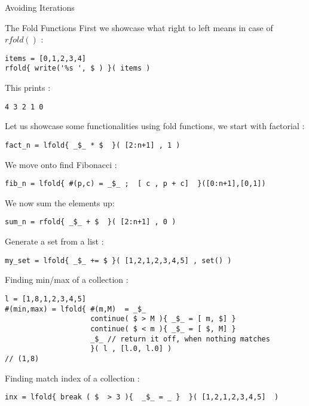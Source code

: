\begin{section}{Avoiding Iterations}
\begin{subsection}{The Fold Functions}
First we showcase what right to left means in case of $rfold()$ :

\begin{lstlisting}[style=JexlStyle]
items = [0,1,2,3,4]
rfold{ write('%s ', $ ) }( items )
\end{lstlisting}
This prints :
\begin{lstlisting}[style=all]
4 3 2 1 0 
\end{lstlisting}



Let us showcase some functionalities using fold functions,
we start with factorial : 

\begin{lstlisting}[style=JexlStyle]
fact_n = lfold{ _$_ * $  }( [2:n+1] , 1 )
\end{lstlisting}

We move onto find Fibonacci : 

\begin{lstlisting}[style=JexlStyle]
fib_n = lfold{ #(p,c) = _$_ ;  [ c , p + c]  }([0:n+1],[0,1])
\end{lstlisting}

We now sum the elements up: 

\begin{lstlisting}[style=JexlStyle]
sum_n = rfold{ _$_ + $  }( [2:n+1] , 0 )
\end{lstlisting}

Generate a set from a list : 

\begin{lstlisting}[style=JexlStyle]
my_set = lfold{ _$_ += $ }( [1,2,1,2,3,4,5] , set() )
\end{lstlisting}

Finding min/max of a collection : 

\begin{lstlisting}[style=JexlStyle]
l = [1,8,1,2,3,4,5] 
#(min,max) = lfold{ #(m,M)  = _$_ 
                    continue( $ > M ){ _$_ = [ m, $] }   
                    continue( $ < m ){ _$_ = [ $, M] } 
                    _$_ // return it off, when nothing matches   
                    }( l , [l.0, l.0] )
// (1,8)                    
\end{lstlisting}

Finding match index of a collection : 

\begin{lstlisting}[style=JexlStyle]
inx = lfold{ break ( $  > 3 ){  _$_ = _ }  }( [1,2,1,2,3,4,5]  )
\end{lstlisting}


\end{subsection}
\end{section}
